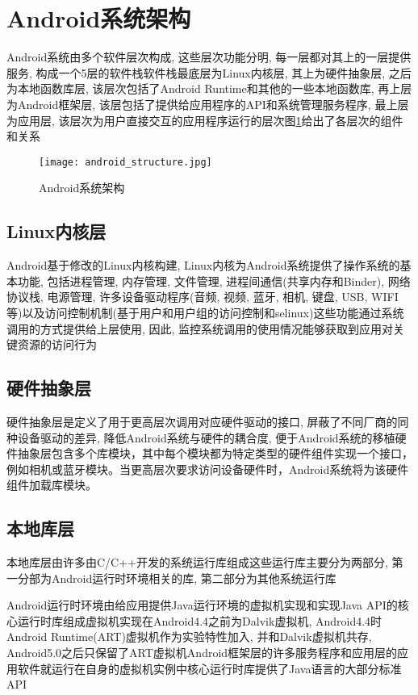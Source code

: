\section{Android系统架构}
Android系统由多个软件层次构成, 这些层次功能分明, 每一层都对其上的一层提供服务, 构成一个5层的软件栈\juhao 软件栈最底层为Linux内核层, 其上为硬件抽象层, 之后为本地函数库层, 该层次包括了Android Runtime和其他的一些本地函数库, 再上层为Android框架层, 该层包括了提供给应用程序的API和系统管理服务程序, 最上层为应用层, 该层次为用户直接交互的应用程序运行的层次\juhao  图\ref{androidStructure}给出了各层次的组件和关系\juhao
\begin{figure}[ht]
\centering
\texttt{[image: android\_structure.jpg]}
\caption{Android系统架构}
\label{androidStructure}
\end{figure}

\subsection*{Linux内核层} 
Android基于修改的Linux内核构建, Linux内核为Android系统提供了操作系统的基本功能, 包括进程管理, 内存管理, 文件管理, 进程间通信(共享内存和Binder), 网络协议栈, 电源管理, 许多设备驱动程序(音频, 视频, 蓝牙, 相机, 键盘, USB, WIFI等)以及访问控制机制(基于用户和用户组的访问控制和selinux)\juhao 这些功能通过系统调用的方式提供给上层使用, 因此, 监控系统调用的使用情况能够获取到应用对关键资源的访问行为\juhao

\subsection*{硬件抽象层}
硬件抽象层是定义了用于更高层次调用对应硬件驱动的接口, 屏蔽了不同厂商的同种设备驱动的差异, 降低Android系统与硬件的耦合度, 便于Android系统的移植\juhao 硬件抽象层包含多个库模块，其中每个模块都为特定类型的硬件组件实现一个接口，例如相机或蓝牙模块。当更高层次要求访问设备硬件时，Android系统将为该硬件组件加载库模块。

\subsection*{本地库层}
本地库层由许多由C/C++开发的系统运行库组成\juhao 这些运行库主要分为两部分, 第一分部为Android运行时环境相关的库, 第二部分为其他系统运行库\juhao 

Android运行时环境由给应用提供Java运行环境的虚拟机实现和实现Java API的核心运行时库组成\juhao 虚拟机实现在Android4.4之前为Dalvik虚拟机, Android4.4时Android Runtime(ART)虚拟机作为实验特性加入, 并和Dalvik虚拟机共存, Android5.0之后只保留了ART虚拟机\juhao Android框架层的许多服务程序和应用层的应用软件就运行在自身的虚拟机实例中\juhao 核心运行时库提供了Java语言的大部分标准API\juhao

